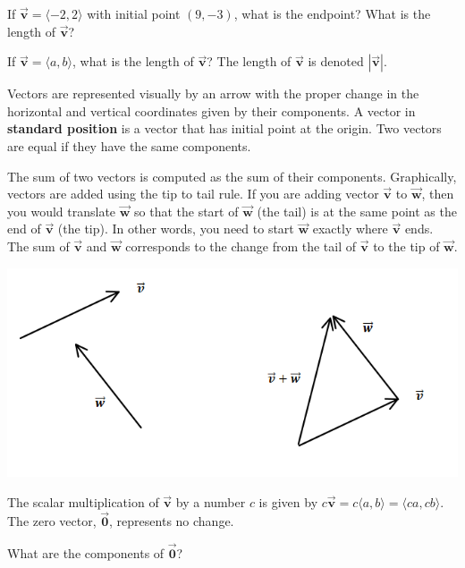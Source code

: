 \bq If $\vec{\textbf{v}}= \langle -2,2\rangle $ with initial point $(9,-3)$, what is the endpoint? What is the length of $\vec{\textbf{v}}$?
\eq

\bq If $\vec{\textbf{v}}= \langle a,b\rangle $, what is the length of $\vec{\textbf{v}}$? The length of $\vec{\textbf{v}}$ is denoted $|\vec{\textbf{v}}|$.
\eq


\begin{info} Vectors are represented visually by an arrow with the proper change in the horizontal and vertical coordinates given by their components. A vector in \textbf{standard position} is a vector that has initial point at the origin. Two vectors are equal if they have the same components.

The sum of two vectors is computed as the sum of their components. Graphically, vectors are added using the tip to tail rule. If you are adding vector $\vec{\textbf{v}}$ to $\vec{\textbf{w}}$, then you would translate $\vec{\textbf{w}}$ so that the start of $\vec{\textbf{w}}$ (the tail) is at the same point as the end of $\vec{\textbf{v}}$ (the tip). In other words, you need to start $\vec{\textbf{w}}$ exactly where $\vec{\textbf{v}}$ ends. The sum of $\vec{\textbf{v}}$ and $\vec{\textbf{w}}$ corresponds to the change from the tail of $\vec{\textbf{v}}$ to the tip of $\vec{\textbf{w}}$.

\begin{center} \includegraphics[scale=.75]{vecadd.png} \end{center}

The scalar multiplication of $\vec{\textbf{v}}$ by a number $c$ is given by $c \vec{\textbf{v}} = c \langle a,b\rangle=\langle ca,cb\rangle$. The zero vector, $\vec{\textbf{0}}$, represents no change. \end{info}

\bq What are the components of $\vec{\textbf{0}}$? \eq

